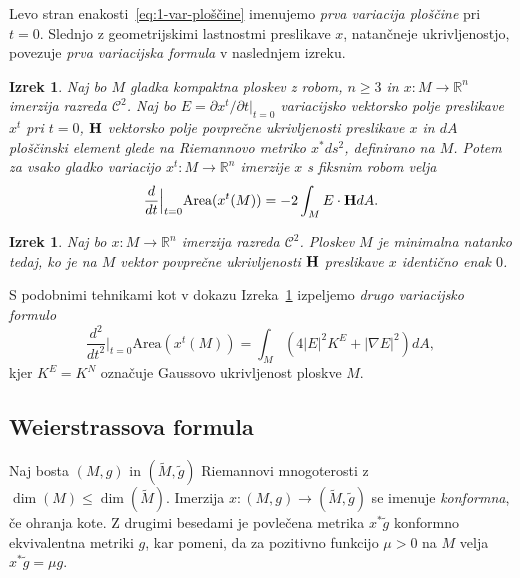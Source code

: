 \documentclass[12pt,a4paper,twoside]{article}
\theoremstyle{definition} %
\theoremstyle{plain} %
\newtheorem{izrek}[definicija]{Izrek}
\numberwithin{equation}{section}  %
\newcommand{\R}{\mathbb R}
\begin{document}
Levo stran enakosti~\ref{eq:1-var-ploščine} imenujemo \emph{prva variacija ploščine} pri $t=0$. Slednjo z geometrijskimi lastnostmi preslikave $x$, natančneje ukrivljenostjo, povezuje \emph{prva variacijska formula} v naslednjem izreku. 

\begin{izrek} \label{izr:1-var-formula}
Naj bo $M$ gladka kompaktna ploskev z robom, $n \geq 3$ in $x \colon M \to \R^{n}$ imerzija razreda $\mathcal{C}^2$. Naj bo $E = \partial{x^{t}} / \partial{t}|_{t=0}$ variacijsko vektorsko polje preslikave $x^{t}$ pri $t=0$, $\textbf{\textup{H}}$ vektorsko polje povprečne ukrivljenosti preslikave $x$ in $dA$ ploščinski element glede na Riemannovo metriko $x^{*}ds^2$, definirano na $M$.
Potem za vsako gladko variacijo $x^{t} \colon M \to \R^{n}$ imerzije $x$ s fiksnim robom velja
\begin{equation} \label{eq:1-var-formula}
\frac{d}{dt} \Big|_{t=0} \text{Area}(x^{t}(M)) = -2 \int_{M} {E \cdot \textbf{\textup{H}} dA}.
\end{equation}
\end{izrek}

\begin{izrek}
Naj bo $x \colon M \to \R^{n}$ imerzija razreda $\mathcal{C}^2$. Ploskev $M$ je minimalna natanko tedaj, ko je na $M$ vektor povprečne ukrivljenosti $\textbf{\textup{H}}$ preslikave $x$ identično enak $0$.
\end{izrek}

S podobnimi tehnikami kot v dokazu Izreka~\ref{izr:1-var-formula} izpeljemo \emph{drugo variacijsko formulo}
\begin{equation}
\frac{d^2}{dt^2} \Big|_{t=0} \text{Area}(x^{t}(M)) = \int_{M} {(4|E|^{2} K^{E} + |\nabla{E}|^2) dA},
\end{equation}
kjer $K^{E} = K^{N}$ označuje Gaussovo ukrivljenost ploskve $M$.

\subsection{Weierstrassova formula}
%
Naj bosta $(M,g)$ in $(\widetilde{M},\tilde{g})$ Riemannovi mnogoterosti z $\dim(M) \leq \dim(\widetilde{M})$.
Imerzija $x \colon (M,g) \to (\widetilde{M}, \tilde{g})$ se imenuje \emph{konformna}, če ohranja kote.
Z drugimi besedami je povlečena metrika $x^{*}\tilde{g}$ konformno ekvivalentna metriki $g$, kar pomeni, da za pozitivno funkcijo $\mu > 0$ na $M$ velja $x^{*}\tilde{g} = \mu g$.
\end{document}
